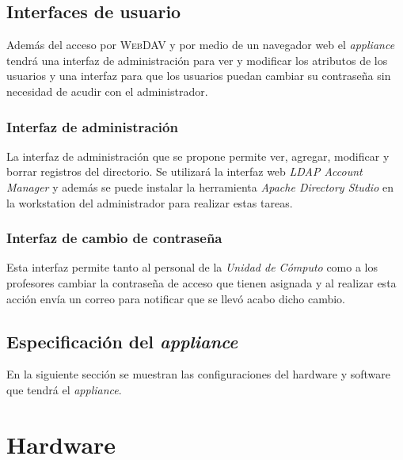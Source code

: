       \subsection {Interfaces de usuario}

Adem\'{a}s del acceso por \textsc{WebDAV} y por medio de un navegador web el \textit{appliance} tendr\'{a} una interfaz de administraci\'{o}n para ver y modificar los atributos de los usuarios y una interfaz para que los usuarios puedan cambiar su contrase\~{n}a sin necesidad de acudir con el administrador.

        \subsubsection {Interfaz de administraci\'{o}n}

La interfaz de administraci\'{o}n que se propone permite ver, agregar, modificar y borrar registros del directorio. Se utilizar\'{a} la interfaz web \textit{LDAP Account Manager} y adem\'{a}s se puede instalar la herramienta \textit{Apache Directory Studio} en la workstation del administrador para realizar  estas tareas.

        \subsubsection {Interfaz de cambio de contrase\~{n}a}

Esta interfaz permite tanto al personal de la \textit{Unidad de C\'{o}mputo} como a los profesores cambiar la contrase\~{n}a de acceso que tienen asignada y al realizar esta acci\'{o}n env\'{i}a un correo para notificar que se llev\'{o} acabo dicho cambio.

    \subsection {Especificaci\'{o}n del \textit{appliance}}

En la siguiente secci\'{o}n se muestran las configuraciones del hardware y software que tendr\'{a} el \textit{appliance}.

      \section {Hardware}

